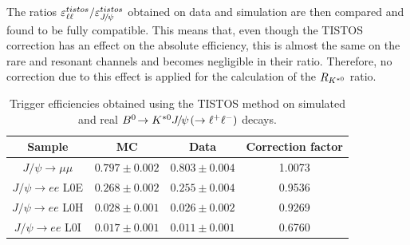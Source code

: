 %
The ratios $\varepsilon^{tistos}_{\ell\ell} / \varepsilon^{tistos}_{\jpsi}$ obtained on
data and simulation are then compared and found to be fully compatible. This means that, even though
the TISTOS correction has an effect on the absolute efficiency, this is almost the same
on the rare and resonant channels and becomes negligible in their ratio.
Therefore, no correction due to this effect is applied for the calculation of the $R_{{{K}^{*0}}}$ ratio.
%
\begin{table}[hb!]
\begin{center}
 \caption{Trigger efficiencies obtained using the TISTOS method on
 simulated and real $\decay{\Bz}{\Kstarz\jpsi(\to\ell^+\ell^-)}$ decays.}
\begin{tabular}{|c|c|c|c|}
\hline
 Sample 							&  MC  		& Data 		& Correction factor		\\ \hline
$ J/\psi \rightarrow \mu\mu$        & $ 0.797  \pm  0.002 $ & $ 0.803  \pm  0.004 $  &  1.0073  \\
$J/\psi \rightarrow ee$ L0E     & $ 0.268  \pm  0.002 $ & $ 0.255  \pm  0.004 $  &  0.9536   \\
$J/\psi \rightarrow ee$ L0H     & $ 0.028  \pm  0.001 $ & $ 0.026  \pm  0.002 $  &  0.9269   \\
$J/\psi \rightarrow ee$ L0I     & $ 0.017  \pm  0.001 $ & $ 0.011  \pm  0.001 $  &  0.6760   \\
 \hline 
  \end{tabular}
\label{tab:tistos}
\end{center}
\end{table}
%
